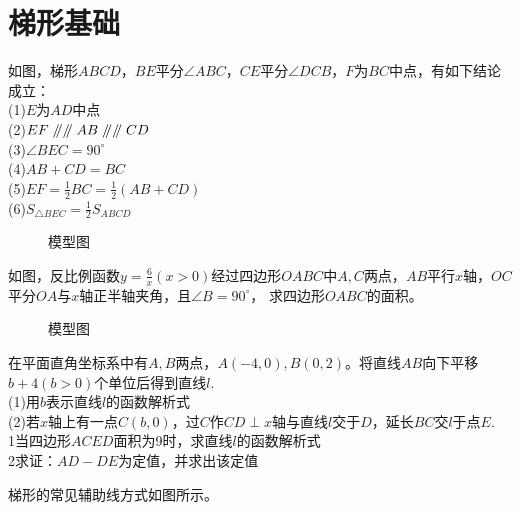 \section{梯形基础}
\begin{definition}
    如图，梯形$ABCD$，$BE$平分$\angle ABC$，$CE$平分$\angle DCB$，$F$为$BC$中点，有如下结论成立：\\
    (1)$E$为$AD$中点 \\
    (2)$EF\mathrel{/\mkern-5mu/} \mathrel{/\mkern-5mu/} AB \mathrel{/\mkern-5mu/} \mathrel{/\mkern-5mu/} CD$ \\
    (3)$\angle BEC=90^\circ$ \\
    (4)$AB+CD=BC$ \\
    (5)$EF=\frac{1}{2}BC=\frac{1}{2}(AB+CD)$ \\
    (6)$S_{\triangle BEC}=\frac{1}{2}S_{ABCD}$
\end{definition}
\begin{figure}[H]
    \centering
    \resizebox{4cm}{!}{}
    \caption{模型图}
\end{figure}
\begin{problem}
如图，反比例函数$y=\frac{6}{x}(x>0)$经过四边形$OABC$中$A,C$两点，$AB$平行$x$轴，$OC$平分$OA$与$x$轴正半轴夹角，且$\angle B=90^\circ$，
求四边形$OABC$的面积。
\end{problem}
\begin{figure}[H]
    \centering
    \resizebox{4cm}{!}{}
    \caption{模型图}
\end{figure}
\begin{problem}
在平面直角坐标系中有$A,B$两点，$A(-4,0),B(0,2)$。将直线$AB$向下平移$b+4(b>0)$个单位后得到直线$l$. \\
(1)用$b$表示直线$l$的函数解析式 \\
(2)若$x$轴上有一点$C(b,0)$，过$C$作$CD\perp x$轴与直线$l$交于$D$，延长$BC$交$l$于点$E$. \\
\textcircled{\small{1}}当四边形$ACED$面积为9时，求直线$l$的函数解析式 \\
\textcircled{\small{2}}求证：$AD-DE$为定值，并求出该定值
\end{problem}
\begin{definition}
    梯形的常见辅助线方式如图所示。
\end{definition}
\begin{figure}[H]
    \centering
    \resizebox{8cm}{!}{}
\end{figure}
